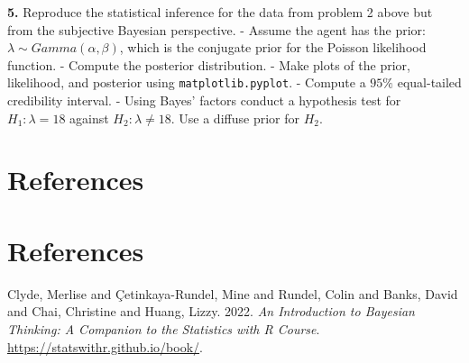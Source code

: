 \documentclass[
  letterpaper,
  DIV=11,
  numbers=noendperiod]{scrreprt}
\newlength{\cslhangindent}
\newlength{\cslentryspacingunit} %
\newenvironment{CSLReferences}[2] %
 {%
  \setlength{\parindent}{0pt}
  \ifodd #1
  \let\oldpar\par
  \def\par{\hangindent=\cslhangindent\oldpar}
  \fi
  \setlength{\parskip}{#2\cslentryspacingunit}
 }%
 {}
\begin{document}
\textbf{5.} Reproduce the statistical inference for the data from
problem 2 above but from the subjective Bayesian perspective. - Assume
the agent has the prior: \(\lambda \sim Gamma(\alpha, \beta)\), which is
the conjugate prior for the Poisson likelihood function. - Compute the
posterior distribution. - Make plots of the prior, likelihood, and
posterior using \texttt{matplotlib.pyplot}. - Compute a \(95\%\)
equal-tailed credibility interval. - Using Bayes' factors conduct a
hypothesis test for \(H_{1}: \lambda = 18\) against
\(H_{2}: \lambda \ne 18\). Use a diffuse prior for \(H_{2}\).


\chapter*{References}\label{references}



\chapter*{References}\label{references-1}


\label{refs}
\begin{CSLReferences}{1}{0}
Clyde, Merlise and Çetinkaya-Rundel, Mine and Rundel, Colin and Banks,
David and Chai, Christine and Huang, Lizzy. 2022. \emph{{An Introduction
to Bayesian Thinking}: {A Companion to the Statistics with R Course}}.
\url{https://statswithr.github.io/book/}.

\end{CSLReferences}
\end{document}

